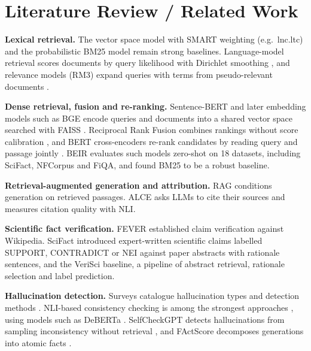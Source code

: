 \documentclass[conference]{IEEEtran}
\begin{document}
\section{Literature Review / Related Work}
\textbf{Lexical retrieval.} The vector space model with SMART weighting (e.g.\ lnc.ltc) \cite{manning2008ir} and the
probabilistic BM25 model \cite{robertson2009bm25} remain strong baselines. Language-model retrieval scores documents by
query likelihood with Dirichlet smoothing \cite{zhai2001smoothing}, and relevance models (RM3) expand queries with terms
from pseudo-relevant documents \cite{lavrenko2001relevance}.

\textbf{Dense retrieval, fusion and re-ranking.} Sentence-BERT \cite{reimers2019sbert} and later embedding models such as
BGE \cite{xiao2024cpack} encode queries and documents into a shared vector space searched with FAISS \cite{johnson2021faiss}.
Reciprocal Rank Fusion combines rankings without score calibration \cite{cormack2009rrf}, and BERT cross-encoders re-rank
candidates by reading query and passage jointly \cite{nogueira2019passage}. BEIR \cite{thakur2021beir} evaluates such
models zero-shot on 18 datasets, including SciFact, NFCorpus and FiQA, and found BM25 to be a robust baseline.

\textbf{Retrieval-augmented generation and attribution.} RAG \cite{lewis2020rag} conditions generation on retrieved
passages. ALCE \cite{gao2023alce} asks LLMs to cite their sources and measures citation quality with NLI.

\textbf{Scientific fact verification.} FEVER \cite{thorne2018fever} established claim verification against Wikipedia.
SciFact \cite{wadden2020scifact} introduced expert-written scientific claims labelled SUPPORT, CONTRADICT or NEI against
paper abstracts with rationale sentences, and the VeriSci baseline, a pipeline of abstract retrieval, rationale selection
and label prediction.

\textbf{Hallucination detection.} Surveys catalogue hallucination types and detection methods \cite{ji2023survey}.
NLI-based consistency checking is among the strongest approaches \cite{honovich2022true, laban2022summac}, using models
such as DeBERTa \cite{he2023debertav3}. SelfCheckGPT detects hallucinations from sampling inconsistency without
retrieval \cite{manakul2023selfcheckgpt}, and FActScore decomposes generations into atomic facts \cite{min2023factscore}.
\end{document}
